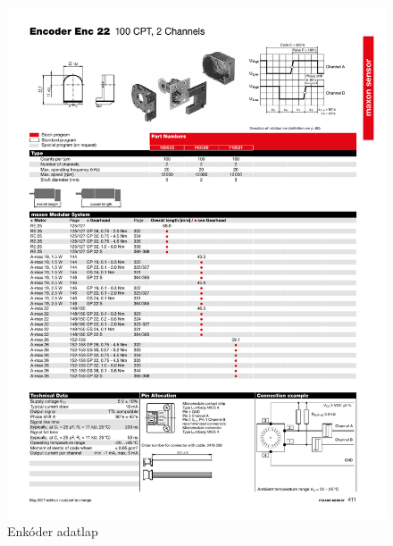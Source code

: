 \begin{figure}[H]
    \begin{center}
    \includegraphics[width=\textwidth]{images/encoder.pdf}
    \caption{Enkóder adatlap}\label{fig:encoder_datasheet}
    \end{center}
\end{figure}

\cleardoublepage
